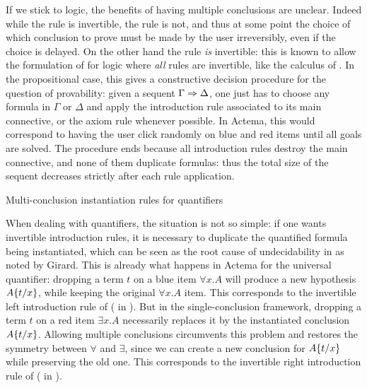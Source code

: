 If we stick to  logic, the benefits of having multiple conclusions
are unclear. Indeed while the {} rule is invertible, the
{} rule is not, and thus at some point the choice of which
conclusion to prove must be made by the user irreversibly, even if the choice is
delayed. On the other hand the
{} rule \emph{is} invertible: this is known to allow the
formulation of  for  logic where \emph{all} rules are
invertible, like the  calculus of . In
the propositional case, this gives a constructive decision procedure for the
question of provability: given a sequent $\Gamma \Rightarrow \Delta$, one just has to
choose any formula in $\Gamma$ or $\Delta$ and apply the introduction rule
associated to its main connective, or the axiom rule whenever possible. In
Actema, this would correspond to having the user click randomly on blue and red
items until all goals are solved. The procedure ends because all introduction
rules destroy the main connective, and none of them duplicate formulas: thus the
total size of the sequent decreases strictly after each rule application.

\begin{marginfigure}
  \caption{Multi-conclusion instantiation rules for quantifiers}
\end{marginfigure}

When dealing with quantifiers, the situation is not so simple: if one wants
invertible introduction rules, it is necessary to duplicate the quantified
formula being instantiated, which can be seen as the root cause of
undecidability in  as noted by
Girard\cite[Section~3.3.2]{girard:hal-01322183}. This is already what happens in
Actema for the universal quantifier: dropping a term $t$ on a blue item $\forall
x. A$ will produce a new hypothesis $A \{ t / x \}$, while keeping the
original $\forall x. A$ item. This corresponds to the invertible left
introduction rule of  ({} in ).
But in the single-conclusion framework, dropping a term $t$ on a red item
$\exists x. A$ necessarily replaces it by the instantiated conclusion
$A \{ t / x \}$. Allowing multiple conclusions circumvents this problem and
restores the symmetry between $\forall$ and $\exists$, since we can create a new
conclusion for $A \{ t / x \}$ while preserving the old one. This corresponds
to the invertible right introduction rule of  ({} in
).

